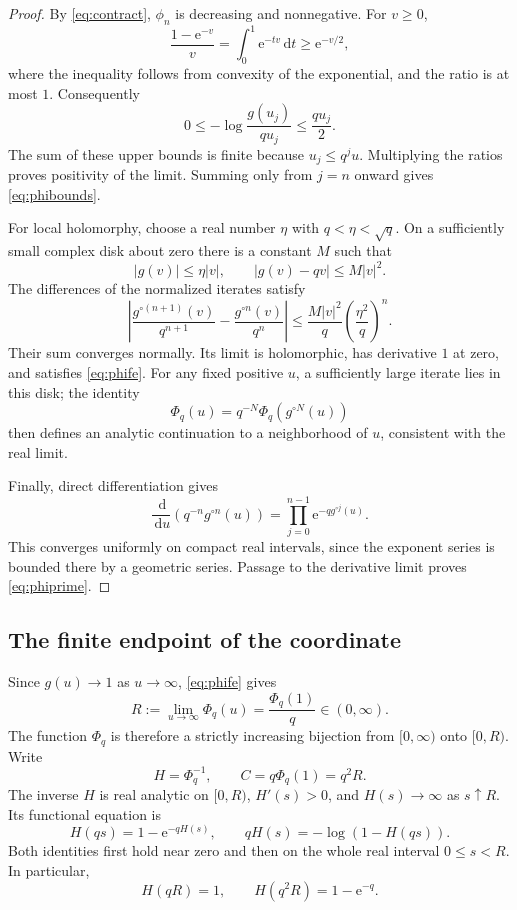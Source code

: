\documentclass[11pt,letterpaper]{article}
\theoremstyle{definition}\newtheorem{definition}[theorem]{Definition}
\theoremstyle{remark}\newtheorem{remark}[theorem]{Remark}
\newcommand{\dd}{\,\mathrm d}
\newcommand{\ee}{\mathrm e}
\newcommand{\PhiQ}{\Phi_q}
\numberwithin{equation}{section}
\begin{document}
\begin{proof}
By \eqref{eq:contract}, $\phi_n$ is decreasing and nonnegative. For $v\geq0$,
\[
 \frac{1-\ee^{-v}}v=\int_0^1\ee^{-tv}\dd t\geq\ee^{-v/2},
\]
where the inequality follows from convexity of the exponential, and the ratio is at most $1$. Consequently
\[
 0\leq-\log\frac{g(u_j)}{qu_j}\leq\frac{qu_j}{2}.
\]
The sum of these upper bounds is finite because $u_j\leq q^j u$. Multiplying the ratios proves positivity of the limit. Summing only from $j=n$ onward gives \eqref{eq:phibounds}.

For local holomorphy, choose a real number $\eta$ with $q<\eta<\sqrt q$. On a sufficiently small complex disk about zero there is a constant $M$ such that
\[
 |g(v)|\leq\eta|v|,\qquad |g(v)-qv|\leq M|v|^2.
\]
The differences of the normalized iterates satisfy
\[
 \left|\frac{g^{\circ(n+1)}(v)}{q^{n+1}}-
       \frac{g^{\circ n}(v)}{q^n}\right|
 \leq \frac{M|v|^2}{q}\left(\frac{\eta^2}{q}\right)^n.
\]
Their sum converges normally. Its limit is holomorphic, has derivative $1$ at zero, and satisfies \eqref{eq:phife}. For any fixed positive $u$, a sufficiently large iterate lies in this disk; the identity
\[
 \PhiQ(u)=q^{-N}\PhiQ(g^{\circ N}(u))
\]
then defines an analytic continuation to a neighborhood of $u$, consistent with the real limit.

Finally, direct differentiation gives
\[
 \frac{\dd}{\dd u}\left(q^{-n}g^{\circ n}(u)\right)
 =\prod_{j=0}^{n-1}\ee^{-qg^{\circ j}(u)}.
\]
This converges uniformly on compact real intervals, since the exponent series is bounded there by a geometric series. Passage to the derivative limit proves \eqref{eq:phiprime}.
\end{proof}

\subsection{The finite endpoint of the coordinate}
Since $g(u)\to1$ as $u\to\infty$, \eqref{eq:phife} gives
\begin{equation}\label{eq:R}
 R:=\lim_{u\to\infty}\PhiQ(u)=\frac{\PhiQ(1)}q\in(0,\infty).
\end{equation}
The function $\PhiQ$ is therefore a strictly increasing bijection from $[0,\infty)$ onto $[0,R)$. Write
\begin{equation}\label{eq:Hdef}
 H=\PhiQ^{-1},\qquad C=q\PhiQ(1)=q^2R.
\end{equation}
The inverse $H$ is real analytic on $[0,R)$, $H'(s)>0$, and $H(s)\to\infty$ as $s\uparrow R$. Its functional equation is
\begin{equation}\label{eq:Hfe}
 H(qs)=1-\ee^{-qH(s)},\qquad
 qH(s)=-\log(1-H(qs)).
\end{equation}
Both identities first hold near zero and then on the whole real interval $0\leq s<R$. In particular,
\begin{equation}\label{eq:Hspecial}
 H(qR)=1,\qquad H(q^2R)=1-\ee^{-q}.
\end{equation}
\end{document}
